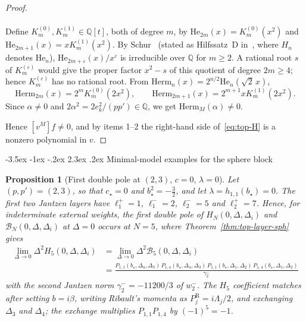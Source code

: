 \documentclass[twoside,10pt]{article}
\makeatletter
\numberwithin{equation}{section}
\theoremstyle{slbody}
\newtheorem{proposition}[theorem]{Proposition}
\theoremstyle{definition}
\theoremstyle{remark}
\renewcommand{\section}{%
  \@startsection{section}{1}{\z@}%
    {-3.5ex \@plus -1ex \@minus -.2ex}%
    {2.3ex \@plus .2ex}%
    {\normalfont\large\bfseries}}
\makeatother
\begin{document}
\begin{proof}
\begin{enumerate}
\begin{itemize}
\begin{gather*}
    \end{gather*}
    Define \(K^{(0)}_m,K^{(1)}_m\in\mathbb Q[t]\), both of degree \(m\), by
    \(\mathrm{He}_{2m}(x)=K^{(0)}_m(x^2)\) and
    \(\mathrm{He}_{2m+1}(x)=xK^{(1)}_m(x^2)\).  By Schur~\cite{Schur1929}
    (stated as Hilfssatz~D in~\cite[\S1, p.~54]{Schur1931}, where \(H_n\)
    denotes \(\mathrm{He}_n\)), \(\mathrm{He}_{2m+\varepsilon}(x)/x^\varepsilon\) is
    irreducible over \(\mathbb Q\) for \(m\geq2\).  A rational root \(s\) of
    \(K^{(\varepsilon)}_m\) would give the proper factor \(x^2-s\) of this
    quotient of degree \(2m\geq4\); hence \(K^{(\varepsilon)}_m\) has no rational
    root.  From
    \(\mathrm{Herm}_n(x)=2^{n/2}\mathrm{He}_n(\sqrt2\,x)\),
    \[
     \mathrm{Herm}_{2m}(x)=2^mK^{(0)}_m(2x^2),\qquad \mathrm{Herm}_{2m+1}(x)=2^{m+1}xK^{(1)}_m(2x^2).
    \]
    Since \(\alpha\neq0\) and \(2\alpha^2=2e_k^2/(pp')\in\mathbb Q\), we get
    \(\mathrm{Herm}_M(\alpha)\neq0\).
  \end{itemize}
\end{enumerate}
Hence \([v^M]f\neq0\), and by items 1--2 the right-hand side
of~\eqref{eq:top-H} is a nonzero polynomial in \(v\).
\end{proof}

\section{Minimal-model examples for the sphere block}\label{sec:examples-sph}

\begin{proposition}[First double pole at \((2,3)\), \(c=0\), \(\lambda=0\)]
\label{prop:c0-example}
Let \((p,p')=(2,3)\), so that \(c_\star=0\) and \(b_\star^2=-\tfrac32\), and
let \(\lambda=h_{1,1}(b_\star)=0\).  The first two Jantzen layers have
\(\ell^+_1=1\), \(\ell^-_1=2\), \(\ell^-_2=5\) and \(\ell^+_2=7\).  Hence, for
indeterminate external weights, the first double pole of \(H_N(0,\Delta,\Delta_i)\) and
\(\mathcal B_N(0,\Delta,\Delta_i)\) at \(\Delta=0\) occurs at \(N=5\),
where Theorem~\ref{thm:top-layer-sph} gives
\begin{align*}
 \lim_{\Delta\to0}\Delta^2 H_5(0,\Delta,\Delta_i)
 &=\lim_{\Delta\to0}\Delta^2 \mathcal B_5(0,\Delta,\Delta_i)\\
 &=\frac{P_{1,1}(b_\star,\Delta_4,\Delta_3)\,P_{1,4}(b_\star,\Delta_4,\Delta_3)\,
         P_{1,1}(b_\star,\Delta_1,\Delta_2)\,P_{1,4}(b_\star,\Delta_1,\Delta_2)}{\gamma^-_2}
\end{align*}
with the second Jantzen norm \(\gamma^-_2=-11200/3\) of \(w^-_2\).  The
\(H_5\) coefficient matches~\cite[\S3.2, (3.24)]{Ribault2019} after setting
\(b=i\beta\), writing Ribault's momenta as \(P^{\mathrm R}_j=i\Lambda_j/2\),
and exchanging \(\Delta_3\) and \(\Delta_4\); the exchange
multiplies \(P_{1,1}P_{1,4}\) by \((-1)^5=-1\).
\end{proposition}
\end{document}
